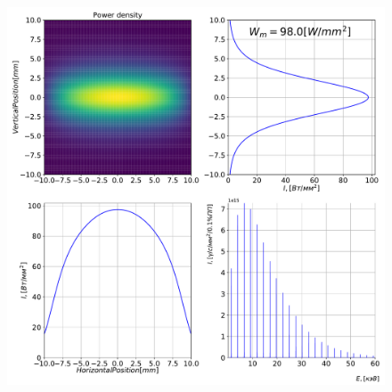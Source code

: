 \documentclass[14pt, hyperref = {colorlinks}]{beamer}
\begin{document}
\begin{frame}
\begin{figure}[h]
\begin{minipage}[h]{0.49\linewidth}
	\raggedright{\includegraphics[width=1.05\linewidth]{pic/power_dens_1-1.pdf}}
	\vspace{-15pt}	
	\tiny{}
\end{minipage}

\end{figure}

\end{frame}
\fi
\end{document}

